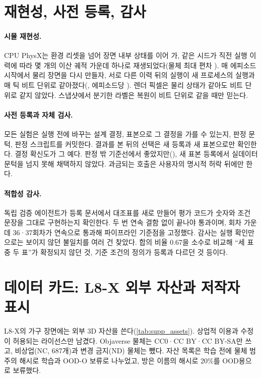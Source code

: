 \clearpage
\setcounter{page}{1}
\maketitlesupplementary

\appendix
\section{재현성, 사전 등록, 감사}
\label{sec:supp_repro}
\paragraph{시뮬 재현성.} CPU PhysX는 환경 리셋을 넘어 장면 내부 상태를 이어 가, 같은 시드가 직전 실행 이력에 따라 몇 개의 이산 궤적 가운데 하나로 재생되었다(물체 최대 편차 ). 매 에피소드 시작에서 물리 장면을 다시 만들자, 서로 다른 이력 뒤의 실행이 새 프로세스의 실행과 매 틱 비트 단위로 같아졌다(, 에피소드당 ). 렌더 픽셀은 물리 상태가 같아도 비트 단위로 같지 않았다. 스냅샷에서 분기한 라벨은 복원이 비트 단위로 같을 때만 믿는다.

\paragraph{사전 등록과 자체 검사.} 모든 실험은 실행 전에 바꾸는 설계 결정, 표본으로 그 결정을 가를 수 있는지, 판정 문턱, 판정 스크립트를 커밋한다. 결과를 본 뒤의 선택은 새 등록과 새 표본으로만 확인한다. 결정 확신도가 그 예다. 판정 밖 기준선에서 좋았지만(), 새 표본 등록에서 실데이터 문턱을 넘지 못해 채택하지 않았다. 과금되는 호출은 사용자의 명시적 허락 뒤에만 한다.

\paragraph{적합성 감사.} 독립 검증 에이전트가 등록 문서에서 대조표를 새로 만들어 평가 코드가 숫자와 조건 문장을 그대로 구현하는지 확인한다. 두 번 연속 결함 없이 끝나야 통과이며, 회차 가운데 36·37회차가 연속으로 통과해 파이프라인 기준점을 고정했다. 감사는 실행 확인만으로는 보이지 않던 불일치를 여러 건 찾았다. 합의 비율 0.67을 소수로 비교해 ``세 표 중 두 표''가 확정되지 않던 것, 기준 조건의 정의가 등록과 다르던 것 등이다.

\section{데이터 카드: L8-X 외부 자산과 저작자 표시}
\label{sec:supp_data}
L8-X의 가구 장면에는 외부 3D 자산을 쓴다(\cref{tab:supp_assets}). 상업적 이용과 수정이 허용되는 라이선스만 남겼다. Objaverse 물체는 CC0·CC BY·CC BY-SA만 쓰고, 비상업(NC, 687개)과 변경 금지(ND) 물체는 뺐다. 자산 목록은 학습 전에 물체 범주의 해시로 학습과 OOD-O 보류로 나누었고, 방은 이름의 해시로 20\%를 OOD용으로 보류했다.

